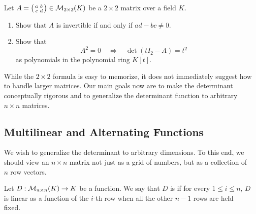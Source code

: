 \begin{exercise}
\label{exc:invertibility_nilpotency_2x2}
Let $A = \left(\begin{smallmatrix} a & b \\ c & d \end{smallmatrix}\right) \in \mathcal{M}_{2 \times 2}(K)$ be a $2 \times 2$ matrix over a field $K$.
\begin{enumerate}
    \item Show that $A$ is invertible if and only if $ad - bc \neq 0$.
    \item Show that
    \[
    A^2 = 0 \quad \Longleftrightarrow \quad \det(tI_2 - A) = t^2
    \]
    as polynomials in the polynomial ring $K[t]$.
\end{enumerate}
\end{exercise}

\begin{goals}\label{goals:determinants}
  While the $2 \times 2$ formula is easy to memorize, it does not immediately suggest how to handle larger matrices. Our main goals now are to make the determinant conceptually rigorous and to generalize the determinant function to arbitrary $n \times n$ matrices.
\end{goals}

\subsection{Multilinear and Alternating Functions}

We wish to generalize the determinant to arbitrary dimensions. To this end, we should view an $n \times n$ matrix not just as a grid of numbers, but as a collection of $n$ row vectors.

\begin{definition}[$n$-Linearity]\label{def:n_linear}
  Let $D : \mathcal{M}_{n \times n}(K) \to K$ be a function. We say that $D$ is  if for every $1 \le i \le n$, $D$ is linear as a function of the $i$-th row when all the other $n-1$ rows are held fixed.
\end{definition}

